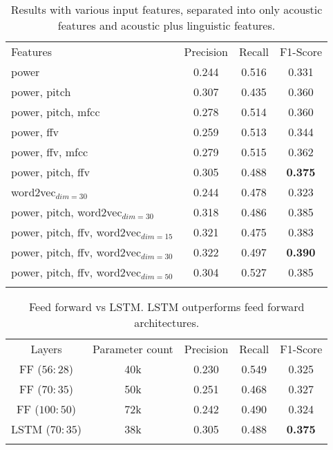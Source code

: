 \begin{table}
    \centering
    \begin{tabular}{lccc}
    \hline\noalign{\smallskip}
    Features & Precision & Recall & F1-Score \\
    \noalign{\smallskip}\svhline\noalign{\smallskip}
    power & 0.244 & 0.516 & 0.331 \\
    power, pitch & 0.307 & 0.435 & 0.360 \\
    power, pitch, mfcc & 0.278 & 0.514 & 0.360 \\
    power, ffv & 0.259 & 0.513 & 0.344 \\
    power, ffv, mfcc & 0.279 & 0.515 & 0.362 \\
    power, pitch, ffv & 0.305 & 0.488 & \bf{0.375} \\
    \noalign{\smallskip}\hline\noalign{\smallskip}
    word2vec$_{dim=30}$ & 0.244 & 0.478 & 0.323 \\
    power, pitch, word2vec$_{dim=30}$ & 0.318 & 0.486 & 0.385 \\
    power, pitch, ffv, word2vec$_{dim=15}$ & 0.321 & 0.475 & 0.383 \\
    power, pitch, ffv, word2vec$_{dim=30}$ & 0.322 & 0.497 & \bf{0.390} \\
    power, pitch, ffv, word2vec$_{dim=50}$ & 0.304 & 0.527 & 0.385 \\
    \noalign{\smallskip}\hline\noalign{\smallskip}
    \end{tabular}
    \caption{Results with various input features, separated into only acoustic features and acoustic plus linguistic features.}\label{tbl:varyfeatures}
\end{table}

\begin{table}
    \centering
    \begin{tabular}{ccccc}
    \hline\noalign{\smallskip}
    Layers & Parameter count & Precision & Recall & F1-Score \\
    \noalign{\smallskip}\svhline\noalign{\smallskip}
    FF ($56 : 28$) & 40k & 0.230 & 0.549 & 0.325 \\
    FF ($70 : 35$) & 50k & 0.251 & 0.468 & 0.327 \\
    FF ($100 : 50$) & 72k & 0.242 & 0.490 & 0.324 \\
    LSTM ($70 : 35$) & 38k & 0.305 & 0.488 & \bf{0.375} \\
    \noalign{\smallskip}\hline\noalign{\smallskip}
    \end{tabular}
    \caption{Feed forward vs LSTM. LSTM outperforms feed forward architectures.}\label{tbl:varylstm}
\end{table}

